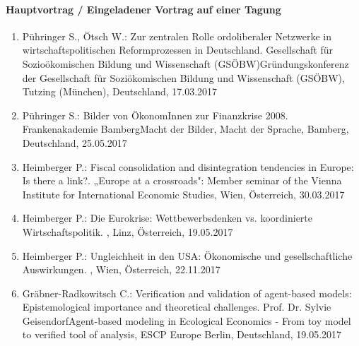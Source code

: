 \paragraph{Hauptvortrag / Eingeladener Vortrag auf einer Tagung}
\begin{enumerate}
	\item Pühringer S., Ötsch W.: Zur zentralen Rolle ordoliberaler Netzwerke in wirtschaftspolitischen Reformprozessen in Deutschland. Gesellschaft für Sozioökomischen Bildung und Wissenschaft (GSÖBW)Gründungskonferenz der Gesellschaft für Soziökomischen Bildung und Wissenschaft (GSÖBW), Tutzing (München), Deutschland, 17.03.2017
	\item Pühringer S.: Bilder von ÖkonomInnen zur Finanzkrise 2008. Frankenakademie BambergMacht der Bilder, Macht der Sprache, Bamberg, Deutschland, 25.05.2017
	\item Heimberger P.: Fiscal consolidation and disintegration tendencies in Europe: Is there a link?. „Europe at a crossroads": Member seminar of the Vienna Institute for International Economic Studies, Wien, Österreich, 30.03.2017
	\item Heimberger P.: Die Eurokrise: Wettbewerbsdenken vs. koordinierte Wirtschaftspolitik. , Linz, Österreich, 19.05.2017
	\item Heimberger P.: Ungleichheit in den USA: Ökonomische und gesellschaftliche Auswirkungen. , Wien, Österreich, 22.11.2017
	\item Gräbner-Radkowitsch C.: Verification and validation of agent-based models: Epistemological importance and theoretical challenges. Prof. Dr. Sylvie GeisendorfAgent-based modeling in Ecological Economics - From toy model to verified tool of analysis, ESCP Europe Berlin, Deutschland, 19.05.2017
\end{enumerate}
